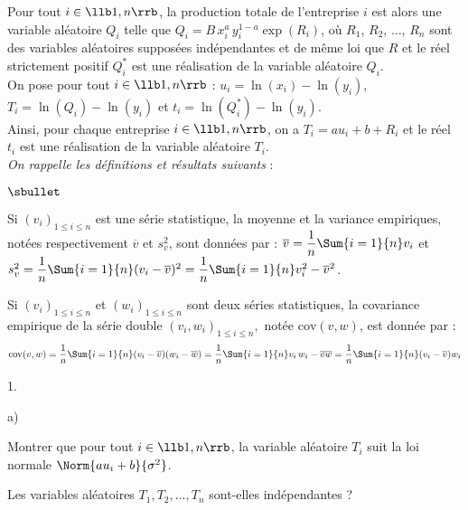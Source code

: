 \noindent
Pour tout $i \in \llb 1,n \rrb$, la production totale de l'entreprise 
$i$ est alors une variable aléatoire $Q_i$ telle que 
$Q_i=B \, x_i^a \, y_i^{1-a} \exp(R_i)$, où $R_1$, $R_2$, 
$\ldots$, $R_n$ sont des variables aléatoires supposées indépendantes 
et de même loi que $R$ et le réel strictement positif $Q_i^*$ est une 
réalisation de la variable aléatoire $Q_i.$\\
On pose pour tout $i \in \llb 1,n \rrb$ : $u_i=\ln(x_i) - \ln(y_i)$, 
$T_i=\ln(Q_i) - \ln(y_i)$ et $t_i=\ln(Q_i^*)-\ln(y_i)$.\\
Ainsi, pour chaque entreprise $i \in \llb 1,n \rrb$, on a 
$T_i=au_i+b+R_i$ et le réel $t_i$ est une réalisation de la variable 
aléatoire $T_i$.\\
{\it On rappelle les définitions et résultats suivants} :
\begin{noliste}{$\sbullet$}
 \item Si $(v_i)_{1 \leq i \leq n}$ est une série statistique, la 
 moyenne et la variance empiriques, notées respectivement 
 $\overline{v}$ et $s_v^2$, sont données par :
 $\overline{v}=\dfrac{1}{n}\Sum{i=1}{n} v_i$ et 
 $s_v^2=\dfrac{1}{n}\Sum{i=1}{n} (v_i-\overline{v})^2 = 
 \dfrac{1}{n}\Sum{i=1}{n} v_i^2-\overline{v}^2$.
 
 
 \newpage
 
 
 
 \item Si $(v_i)_{1 \leq i \leq n}$ et $(w_i)_{1 \leq i \leq n}$ sont 
 deux séries statistiques, la covariance empirique de la série double 
 $(v_i,w_i)_{1 \leq i \leq n},$ notée $\mathrm{cov}(v,w)$, est donnée 
 par :  
 \[
 \mathrm{cov}(v,w)=\dfrac{1}{n}\Sum{i=1}{n}(v_i - 
 \overline{v})(w_i-\overline{w}) = \dfrac{1}{n}\Sum{i=1}{n} v_i \, w_i 
 - \overline{v}\overline{w} = \dfrac{1}{n}\Sum{i=1}{n} 
 (v_i-\overline{v})w_i
 \]
\end{noliste}


\begin{noliste}{1.}
 \setlength{\itemsep}{4mm}
 \setcounter{enumi}{8}
 \item 
 \begin{noliste}{a)}
  \setlength{\itemsep}{2mm}
  \item Montrer que pour tout $i \in \llb 1,n \rrb$, la variable 
  aléatoire $T_i$ suit la loi normale $\Norm{au_i+b}{\sigma^2}$.
  
  

  
  \item Les variables aléatoires $T_1,T_2,...,T_n$ sont-elles 
  indépendantes ?
  
  
 \end{noliste}
\end{noliste}

